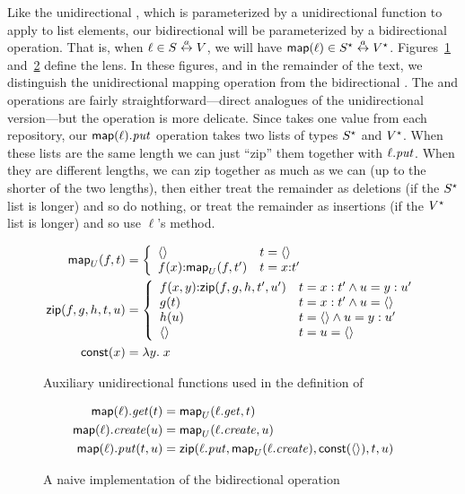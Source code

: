 Like the unidirectional \map, which is parameterized by a unidirectional
function to apply to list elements, our bidirectional \map will be
parameterized by a bidirectional operation. That is, when $\ell \in S \overset{a}{\leftrightarrow}
V$, we will have $\mathsf{map}(\ell) \in S^\star \overset{a}{\leftrightarrow} V^\star$.
Figures~\ref{fig:uni-map-zip-const} and~\ref{fig:naive-asymmetric-map}
define the \map lens. In these figures, and in the remainder of the text, we
distinguish the unidirectional mapping operation \mapU from the
bidirectional \map.  The \GET and \CREATE operations are fairly
straightforward---direct analogues of the unidirectional version---but the
\PUT operation is more delicate. Since \PUT takes one value from each
repository, our $\mathsf{map}(\ell).\mathit{put}$ operation takes two lists of types
$S^\star$ and $V^\star$.
When these lists are the same length we can just ``zip'' them together with
$\ell.\mathit{put}$. When they are different lengths, we can zip together as much
as we can (up to the shorter of the two lengths), then either treat the
remainder as deletions (if the $S^\star$ list is longer) and so do nothing, or
treat the remainder as insertions (if the $V^\star$ list is longer) and so use
$\ell$'s \CREATE method.
\begin{figure}
    \begin{align*}
        \mathsf{map}_U(f,t) &= \left\{\begin{array}{ll}
            \left<\right> & t = \left<\right> \\
            f(x) \mathord{:} \mathsf{map}_U(f,t') & t = x \mathord{:} t'
        \end{array}\right. \\
        \mathsf{zip}(f,g,h,t,u) &= \left\{\begin{array}{ll}
            f(x,y) \mathord{:} \mathsf{zip}(f,g,h,t',u') & t = x:t' \land u = y:u' \\
            g(t) & t = x:t' \land u = \left<\right> \\
            h(u) & t = \left<\right> \land u = y:u' \\
            \left<\right> & t = u = \left<\right>
        \end{array}\right. \\
        \mathsf{const}(x) &= \lambda y.\;x
    \end{align*}
    \caption{Auxiliary unidirectional functions used in the definition of \map}
    \label{fig:uni-map-zip-const}
\end{figure}
\begin{figure}
    \begin{align*}
        \mathsf{map}(\ell).\mathit{get}(t) &= \mathsf{map}_U(\ell.\mathit{get},t) \\
        \mathsf{map}(\ell).\mathit{create}(u) &= \mathsf{map}_U(\ell.\mathit{create},u) \\
        \mathsf{map}(\ell).\mathit{put}(t,u) &=
            \mathsf{zip}(\ell.\mathit{put},\mathsf{map}_U(\ell.\mathit{create}),\mathsf{const}(\left<\right>),t,u)
    \end{align*}
    \caption{A naive implementation of the bidirectional \map operation}
    \label{fig:naive-asymmetric-map}
\end{figure}

